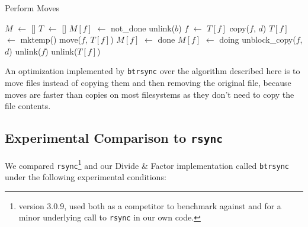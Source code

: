 \documentclass[11pt]{llncs}
\newcommand*\Let[2]{\State #1 $\gets$ #2}
\newcommand{\btrsync}{\texttt{btrsync}\xspace}
\newcommand{\rsync}{\texttt{rsync}\xspace}
\begin{document}
\begin{algorithm}
  \caption{Perform Moves}
  \label{alg:moves}
  \begin{algorithmic}[1]
    \Statex
    \Let{$M$}{[]}
    \Let{$T$}{[]}
      \Let{$M[f]$}{not\_done}
    \EndFor
          \State unlink($b$) 
        \Else
          \State {} 
        \EndIf
      \EndIf
        \Let{$f$}{$T[f]$}
      \EndIf
      \State copy($f$, $d$)
    \EndFunction
        \State \Return {}
      \EndIf
        \Let{$T[f]$}{mktemp()}
        \State move($f$, $T[f]$)
        \Let{$M[f]$}{done}
        \State \Return {}
      \EndIf
      \Let{$M[f]$}{doing}
          \State unblock\_copy($f$, $d$) 
        \EndIf
      \EndFor
        \State unlink($f$)
      \EndIf
        \State unlink($T[f]$)
      \EndIf
    \EndFunction

      \State {}
    \EndFor
  \end{algorithmic}
\end{algorithm}

An optimization implemented by \btrsync over the algorithm described here is to
move files instead of copying them and then removing the original file, because
moves are faster than copies on most filesystems as they don't need to copy the
file contents.

\subsection{Experimental Comparison to \rsync}

We compared \rsync\footnote{version 3.0.9, used both as a competitor to benchmark against and for a minor underlying call to \rsync in our own code.}
and our Divide \& Factor implementation called \btrsync under the following experimental conditions:
\end{document}
